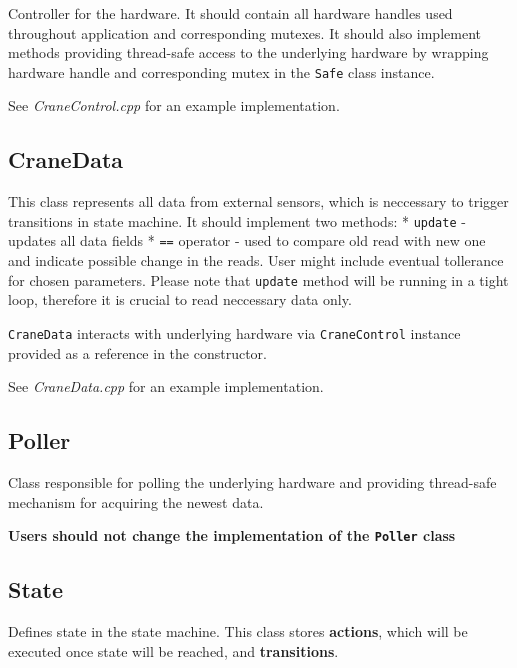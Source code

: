 \documentclass{article}
\begin{document}
Controller for the hardware. It should contain all hardware handles used
throughout application and corresponding mutexes. It should also
implement methods providing thread-safe access to the underlying
hardware by wrapping hardware handle and corresponding mutex in the
\texttt{Safe} class instance.

See \textit{CraneControl.cpp} for an example
implementation.

\subsection*{CraneData}\label{cranedata}

This class represents all data from external sensors, which is
neccessary to trigger transitions in state machine. It should implement
two methods: * \texttt{update} - updates all data fields * \texttt{==}
operator - used to compare old read with new one and indicate possible
change in the reads. User might include eventual tollerance for chosen
parameters. Please note that \texttt{update} method will be running in a
tight loop, therefore it is crucial to read neccessary data only.

\texttt{CraneData} interacts with underlying hardware via
\texttt{CraneControl} instance provided as a reference in the
constructor.

See \textit{CraneData.cpp} for an example
implementation.

\subsection*{Poller}\label{poller}

Class responsible for polling the underlying hardware and providing
thread-safe mechanism for acquiring the newest data.

\textbf{Users should not change the implementation of the
\texttt{Poller} class}

\subsection*{State}\label{state}

Defines state in the state machine. This class stores \textbf{actions},
which will be executed once state will be reached, and
\textbf{transitions}.
\end{document}
